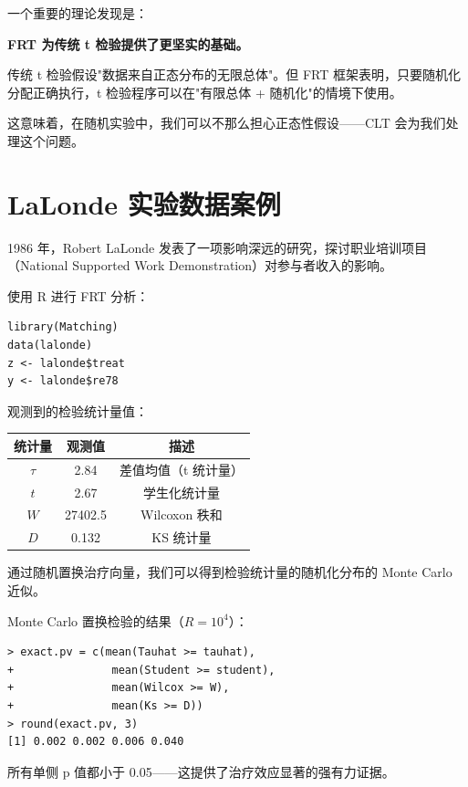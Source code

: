 一个重要的理论发现是：

\begin{center}
\textbf{FRT 为传统 t 检验提供了更坚实的基础。}
\end{center}

传统 t 检验假设"数据来自正态分布的无限总体"。但 FRT 框架表明，只要随机化分配正确执行，t 检验程序可以在"有限总体 + 随机化"的情境下使用。

这意味着，在随机实验中，我们可以不那么担心正态性假设——CLT 会为我们处理这个问题。

\section{LaLonde 实验数据案例}\label{sec:lalonde-data}

1986 年，Robert LaLonde 发表了一项影响深远的研究，探讨职业培训项目（National Supported Work Demonstration）对参与者收入的影响。

使用 R 进行 FRT 分析：

\begin{verbatim}
library(Matching)
data(lalonde)
z <- lalonde$treat
y <- lalonde$re78
\end{verbatim}

观测到的检验统计量值：

\begin{center}
\begin{tabular}{c|c|c}
\hline
统计量 & 观测值 & 描述 \\
\hline
$\hat{\tau}$ & 2.84 & 差值均值（t 统计量）\\
$t$ & 2.67 & 学生化统计量 \\
$W$ & 27402.5 & Wilcoxon 秩和 \\
$D$ & 0.132 & KS 统计量 \\
\hline
\end{tabular}
\end{center}

通过随机置换治疗向量，我们可以得到检验统计量的随机化分布的 Monte Carlo 近似。

Monte Carlo 置换检验的结果（$R = 10^4$）：

\begin{verbatim}
> exact.pv = c(mean(Tauhat >= tauhat),
+               mean(Student >= student),
+               mean(Wilcox >= W),
+               mean(Ks >= D))
> round(exact.pv, 3)
[1] 0.002 0.002 0.006 0.040
\end{verbatim}

所有单侧 p 值都小于 0.05——这提供了治疗效应显著的强有力证据。

